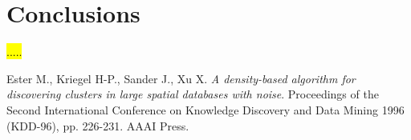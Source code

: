 \documentclass[12pt]{article}
\begin{document}
\section{Conclusions}
\hl{.....}

 


\begin{thebibliography}{9}
 Ester M., Kriegel H-P., Sander J., Xu X.  \textit{A density-based algorithm for discovering clusters in large spatial databases with noise}. Proceedings of the Second International Conference on Knowledge Discovery and Data Mining 1996 (KDD-96), pp. 226-231. AAAI Press. 
\end{thebibliography}
\end{document}

